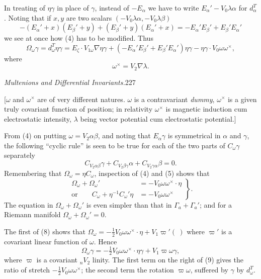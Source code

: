 \documentclass[11pt]{article}
\begin{document}
\indent In treating of $\eta\gamma$ in place of $\gamma$, instead of $-E_\alpha$ we have to write $E_\alpha'-V_0\lambda\alpha$ for $d_\alpha^T$. Noting that if $x,y$ are two scalars $(-V_0\lambda\alpha,-V_0\lambda\beta)$
\[
-(E_\alpha'+x)(E_\beta'+y)+(E_\beta'+y)(E_\alpha'+x)=-E_\alpha'E_\beta'+E_\beta'E_\alpha'
\]
we see at once how (4) has to be modified. Thus
\begin{equation}\Omega_\omega\gamma=d_\omega^T\eta\gamma=E_\zeta\mathbin{\cdot}V_{1\omega}\nabla\eta\gamma+(-E_\alpha'E_\beta'+E_\beta'E_\alpha')\eta\gamma-\eta\gamma\mathbin{\cdot}V_0\omega\omega^\times,\tag{5}\end{equation}
where
\begin{equation}\omega^\times=V_2\nabla\lambda.\tag{6}\end{equation}
\newpage\thispagestyle{empty}\begin{center}\textit{Multenions and Differential Invariants.}\hfill 227\end{center}
[$\omega$ and $\omega^\times$ are of very different natures. $\omega$ is a contravariant \emph{dummy}, $\omega^\times$ is a given truly covariant function of position; in relativity $\omega^\times$ is magnetic induction cum electrostatic intensity, $\lambda$ being vector potential cum electrostatic potential.]

\indent From (4) on putting $\omega=V_2\alpha\beta$, and noting that $E_\alpha\gamma$ is symmetrical in $\alpha$ and $\gamma$, the following ``cyclic rule'' is seen to be true for each of the two parts of $C_\omega\gamma$ separately
\begin{equation}C_{V_2\alpha\beta}\gamma+C_{V_2\beta\gamma}\alpha+C_{V_2\gamma\alpha}\beta=0.\tag{7}\end{equation}
Remembering that $\Omega_\omega=\eta C_\omega$, inspection of (4) and (5) shows that
\begin{equation}
\left.\begin{aligned}
\Omega_\omega+\Omega_\omega'&=-V_0\omega\omega^\times\mathbin{\cdot}\eta\\
\text{or}\qquad C_\omega+\eta^{-1}C_\omega'\eta&=-V_0\omega\omega^\times
\end{aligned}\right\}.\tag{8}
\end{equation}
The equation in $\Omega_\omega+\Omega_\omega'$ is even simpler than that in $\Gamma_a+\Gamma_a'$; and for a Riemann manifold $\Omega_\omega+\Omega_\omega'=0$.

\indent The first of (8) shows that $\Omega_\omega=-\tfrac12V_0\omega\omega^\times\mathbin{\cdot}\eta+V_1\varpi'(\ )$ where $\varpi'$ is a covariant linear function of $\omega$. Hence
\begin{equation}\Omega_\omega\gamma=-\tfrac12V_0\omega\omega^\times\mathbin{\cdot}\eta\gamma+V_1\varpi\omega\gamma,\tag{9}\end{equation}
where $\varpi$ is a covariant ${}_nV_2$ linity. The first term on the right of (9) gives the ratio of stretch $-\tfrac12V_0\omega\omega^\times$; the second term the rotation $\varpi\omega$, suffered by $\gamma$ by $d_\omega^T$.
\end{document}
